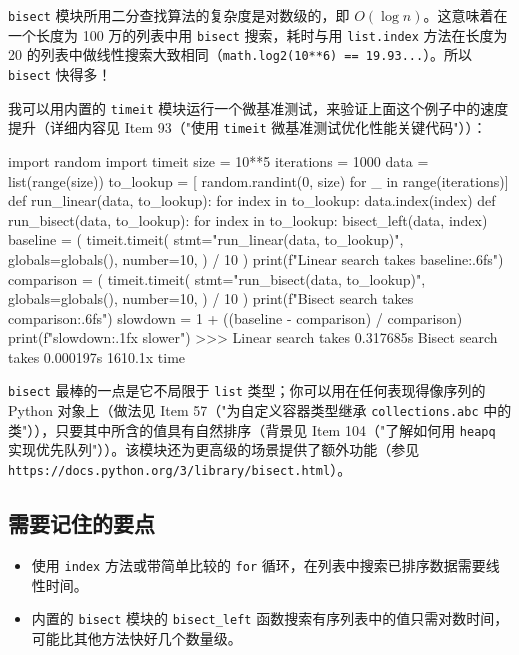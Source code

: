 \texttt{bisect} 模块所用二分查找算法的复杂度是对数级的，即 $O(\log n)$。这意味着在一个长度为 100 万的列表中用 \texttt{bisect} 搜索，耗时与用 \texttt{list.index} 方法在长度为 20 的列表中做线性搜索大致相同（\texttt{math.log2(10**6) == 19.93...}）。所以 \texttt{bisect} 快得多！

我可以用内置的 \texttt{timeit} 模块运行一个微基准测试，来验证上面这个例子中的速度提升（详细内容见 Item 93（"使用 \texttt{timeit} 微基准测试优化性能关键代码"））：

\begin{codebox}[python]
import random
import timeit
size = 10**5
iterations = 1000
data = list(range(size))
to_lookup = [ random.randint(0, size)
for _ in range(iterations)]
def run_linear(data, to_lookup):
    for index in to_lookup:
        data.index(index)
def run_bisect(data, to_lookup):
    for index in to_lookup:
        bisect_left(data, index)
baseline = (
    timeit.timeit(
        stmt="run_linear(data, to_lookup)",
        globals=globals(),
        number=10,
    )
    / 10
)
print(f"Linear search takes {baseline:.6f}s")
comparison = (
    timeit.timeit(
        stmt="run_bisect(data, to_lookup)",
        globals=globals(),
        number=10,
    )
    / 10
)
print(f"Bisect search takes {comparison:.6f}s")
slowdown = 1 + ((baseline - comparison) / comparison)
print(f"{slowdown:.1f}x slower")
>>>
Linear search takes 0.317685s
Bisect search takes 0.000197s
1610.1x time
\end{codebox}

\texttt{bisect} 最棒的一点是它不局限于 \texttt{list} 类型；你可以用在任何表现得像序列的 Python 对象上（做法见 Item 57（"为自定义容器类型继承 \texttt{collections.abc} 中的类"）），只要其中所含的值具有自然排序（背景见 Item 104（"了解如何用 \texttt{heapq} 实现优先队列"））。该模块还为更高级的场景提供了额外功能（参见 \texttt{https://docs.python.org/3/library/bisect.html}）。

\subsection{需要记住的要点}

\begin{itemize}
\item 使用 \texttt{index} 方法或带简单比较的 \texttt{for} 循环，在列表中搜索已排序数据需要线性时间。
\item 内置的 \texttt{bisect} 模块的 \texttt{bisect\_left} 函数搜索有序列表中的值只需对数时间，可能比其他方法快好几个数量级。
\end{itemize}

